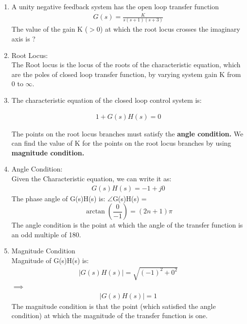 \begin{enumerate}[label=\thesection.\arabic*.,ref=\thesection.\theenumi]
\item A unity negative feedback system has the open loop transfer function 
\begin{align}
    G(s) = \frac{K}{s(s+1)(s+3)} 
    \label{eq:t1}
\end{align}
The value of the gain K ($>$0) at which the root locus crosses the imaginary axis is ?

\solution

\item Root Locus: \\
	  The Root locus is the locus of the roots of the characteristic equation, which are the poles of closed loop transfer function, by varying system gain K from $0$ to $\infty$.

\item The characteristic equation of the closed loop control system is: 

    \begin{align}
         1 + G(s)H(s) = 0    
    \end{align}
    
    The points on the root locus branches must satisfy the \textbf{angle condition.}
    We can find the value of K for the points on the root locus branches by using \textbf{magnitude condition.}

\item Angle Condition: \\
    Given the Characteristic equation, we can write it as:
    \begin{align}
         G(s)H(s) = -1 + j0   
    \end{align}
    The phase angle of G(s)H(s) is:
    $\angle$G(s)H(s) =\[ \arctan(\frac{0}{-1}) = (2n+1)\pi\]
    The angle condition is the point at which the angle of the transfer function is an odd multiple of 180.
   
\item Magnitude Condition \\

    Magnitude of G(s)H(s) is:
    \begin{align}
        |G(s)H(s)| = \sqrt{(-1)^2 + 0^2}
    \end{align}
    $\implies$
    \begin{align}
        |G(s)H(s)| =1 
    \end{align}
    The magnitude condition is that the point (which satisfied the angle condition) at which the magnitude of the transfer function is one.


\end{enumerate}
